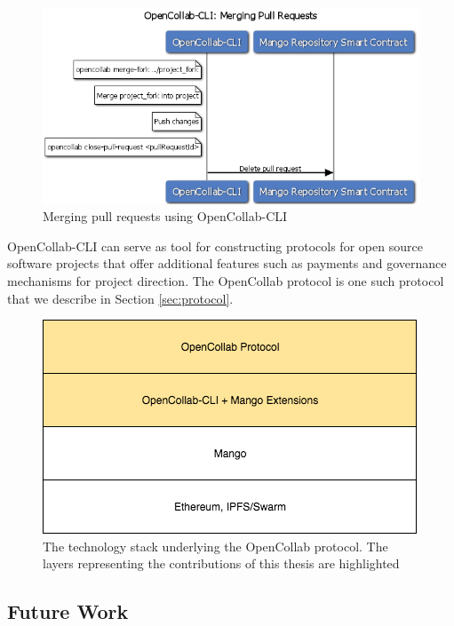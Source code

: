 \begin{figure}[]
  \centering
  \includegraphics[width=\linewidth,keepaspectratio]{figures/OpenCollab-CLI-Merging-Pull-Requests.png}
  \caption{Merging pull requests using OpenCollab-CLI}
  \label{fig:mergePR}
\end{figure}

OpenCollab-CLI can serve as tool for constructing protocols for open source
software projects that offer additional features such as payments and governance
mechanisms for project direction. The OpenCollab protocol is one such protocol that we describe
in Section \ref{sec:protocol}.

\begin{figure}[]
  \centering
  \includegraphics[width=\linewidth,keepaspectratio]{figures/ContributionsStack.png}
  \caption{The technology stack underlying the OpenCollab protocol. The
    layers representing the contributions of this thesis are highlighted}
\end{figure}

\subsection{Future Work}

